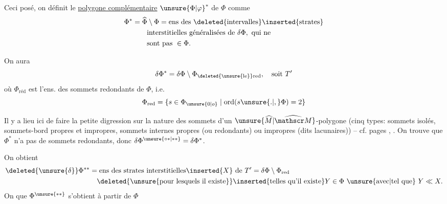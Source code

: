 Ceci posé, on définit le \uline{polygone complémentaire} ${\unsure{\Phi|\varphi}}^{*}$ de $\Phi$ comme
\[
\begin{aligned}
\Phi^*&=\widehat\Phi\setminus\Phi=\text{ens des }\deleted{\text{intervalles}}\inserted{\text{strates}}\\
&\qquad\text{interstitielles généralisées de }\delta\Phi,\text{ qui ne}\\
&\qquad\text{sont pas }\in\Phi.
\end{aligned}
\]

On aura
\[
\delta\Phi^*=\delta\Phi\setminus\Phi_{\deleted{\unsure{\mathrm{le}}}\mathrm{red}},\quad\text{soit }T'
\]
où $\Phi_{\mathrm{réd}}$ est l'ens. des sommets redondants de $\Phi$, i.e.
\[
\Phi_{\mathrm{red}}=\{s\in\Phi_{\unsure{0|o}}\mid\operatorname{ord}(s\unsure{.|,}\Phi)=2\}
\]


Il y a lieu ici de faire la petite digression sur la nature des sommets d'un $\unsure{\widehat M|\widehat{\mathscr M}}$-polygone (cinq types: sommets isolés, sommets-bord propres et impropres, sommets internes propres (ou redondants) ou impropres (dits lacunaires)) -- cf. pages , . On trouve  que $\Phi^*$ n'a pas de sommets redondants, donc $\delta\Phi^{\unsure{\circ *|**}}=\delta\Phi^*$.

On obtient
\[
\begin{aligned}
\deleted{\unsure{\delta}}\Phi^{**}&=\text{ens des strates interstitielles}\inserted{X}\text{ de }T'=\delta\Phi\setminus\Phi_{\mathrm{red}}\\
&\quad\deleted{\text{\unsure{pour lesquels il existe}}}\inserted{\text{telles qu'il existe}}Y\in\Phi\ \unsure{\text{avec}|\text{tel que}}\ Y\ll X.
\end{aligned}
\]
On  que $\Phi^{\unsure{**}}$ s'obtient à partir de $\Phi$

